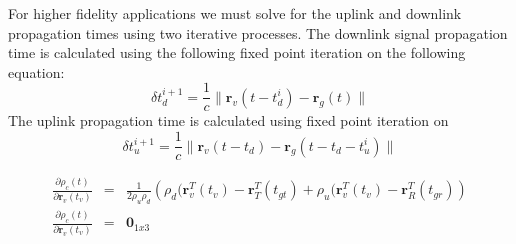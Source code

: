   For higher fidelity applications we must solve for the uplink and downlink
  propagation times using two iterative processes.  The downlink signal propagation
  time is calculated using the following fixed point iteration on the following equation:
%
\begin{equation}
     \delta t_d^{i+1} = \frac{1}{c}\| \mathbf{r}_v( t - t_d^{i}) - \mathbf{r}_g(t)   \|
\end{equation}
%
The uplink propagation time is calculated using fixed point
iteration on
%
\begin{equation}
     \delta t_u^{i+1} = \frac{1}{c}\| \mathbf{r}_v( t - t_d) - \mathbf{r}_g(t - t_d - t_u^{i} )   \|
\end{equation}
%

\begin{eqnarray}
     \frac{\partial \rho_c (t)}{\partial \mathbf{r}_v(t_v)} &=& \frac{1}{2\rho_u\rho_d}
     \left( \rho_d(\mathbf{r}_v^T(t_v) - \mathbf{r}_T^T(t_{gt}) + \rho_u(\mathbf{r}_v^T(t_v) - \mathbf{r}_R^T(t_{gr}  ) \right)\\
     \frac{\partial \rho_c (t)}{\partial \dot{\mathbf{r}}_v(t_v)} &=& \mathbf{0}_{1x3}
\end{eqnarray}
